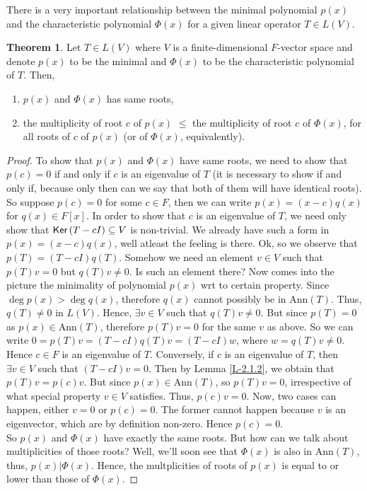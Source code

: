 \documentclass[letterpaper,11pt,twoside]{article}
\theoremstyle{definition}
\theoremstyle{definition}
\newtheorem{theorem}[proposition]{Theorem}
\theoremstyle{definition}
\theoremstyle{definition}
\theoremstyle{definition}
\theoremstyle{definition}
\theoremstyle{remark}
\theoremstyle{definition}
\newcommand{\Ker}[1]{{\fontfamily{lmss}\selectfont 
		\text{Ker}\left (#1\right )
}}
\newcommand{\Ann}[1]{\text{Ann}\left(#1\right)}
\begin{document}
    There is a very important relationship between the minimal polynomial $p(x)$ and the characteristic polynomial $\Phi(x)$ for a given linear operator $T\in L(V)$.
    \begin{theorem}\label{T-2.1.3}
    Let $T \in L(V)$ where $V$ is a finite-dimensional $F$-vector space and denote $p(x)$ to be the minimal and $\Phi(x)$ to be the characteristic polynomial of $T$. Then, \begin{enumerate}
        \item {$p(x)$ and $\Phi(x)$ has same roots,}
        \item {the multiplicity of root $c$ of $p(x)$ $\le$ the multiplicity of root $c$ of $\Phi(x)$, for all roots of $c$ of $p(x)$ (or of $\Phi(x)$, equivalently).}
    \end{enumerate}
    \end{theorem}
    \begin{proof}
        To show that $p(x)$ and $\Phi(x)$ have same roots, we need to show that $p(c) = 0$ if and only if $c$ is an eigenvalue of $T$ (it is necessary to show if and only if, because only then can we say that both of them will have identical roots). So suppose $p(c) = 0$ for some $c\in F$, then we can write $p(x) = (x-c) q(x) $ for $q(x) \in F[x]$. In order to show that $c$ is an eigenvalue of $T$, we need only show that $\Ker{T-cI} \subseteq V$ is non-trivial. We already have such a form in $p(x) = (x-c)q(x)$, well atleast the feeling is there. Ok, so we observe that $p(T) = (T-cI)q(T)$. Somehow we need an element $v\in V$ such that $p(T)v = 0$ but $q(T)v \neq 0$. Is such an element there? Now comes into the picture the minimality of polynomial $p(x)$ wrt to certain property. Since $\deg p(x) > \deg q(x)$, therefore $q(x)$ cannot possibly be in $\Ann{T}$. Thus, $q(T) \neq 0$ in $L(V)$. Hence, $\exists v\in V$ such that $q(T)v \neq 0$. But since $p(T) = 0$ as $p(x) \in \Ann{T}$, therefore $p(T)v = 0$ for the same $v$ as above. So we can write $0 =p(T)v = (T-cI)q(T)v = (T-cI)w$, where $w = q(T)v \neq 0$. Hence $c\in F$ is an eigenvalue of $T$. Conversely, if $c$ is an eigenvalue of $T$, then $\exists v\in V$ such that $(T-cI)v = 0$. Then by Lemma \ref{L-2.1.2}, we obtain that $p(T)v = p(c)v$. But since $p(x)\in \Ann{T}$, so $p(T)v = 0$, irrespective of what special property $v\in V$ satisfies. Thus, $p(c)v = 0$. Now, two cases can happen, either $v= 0$ or $p(c)=0$. The former cannot happen because $v$ is an eigenvector, which are by definition non-zero. Hence $p(c) = 0$. \\
        
        So $p(x)$ and $\Phi(x)$ have exactly the same roots. But how can we talk about multiplicities of those roots? Well, we'll soon see that $\Phi(x)$ is also in $\Ann{T}$, thus, $p(x) | \Phi(x)$. Hence, the multplicities of roots of $p(x)$ is equal to or lower than those of $\Phi(x)$.
    \end{proof}
\end{document}
